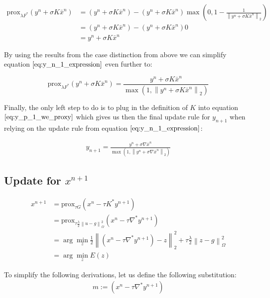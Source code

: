 \documentclass{paper}
\newcommand{\prox}{\text{prox}}
\newcommand{\twonorm}[1]{\left\lVert#1\right\rVert_2}
\newcommand{\norm}[1]{\left\lVert#1\right\rVert}
\begin{document}
\begin{itemize}
		\begin{align}
			\prox_{\lambda F^*}(y^n + \sigma K \bar{x}^{n})
			&= (y^n + \sigma K \bar{x}^{n}) - \left( y^n + \sigma K \bar{x}^{n} \right) \max{\left(0, 1-\frac{1}{\twonorm{y^n + \sigma K \bar{x}^{n} }}\right)} \nonumber \\
			&= (y^n + \sigma K \bar{x}^{n}) - \left( y^n + \sigma K \bar{x}^{n} \right) 0 \nonumber \\
			&= y^n + \sigma K \bar{x}^{n}
		\end{align}
\end{itemize}

By using the results from the case distinction from above we can simplify equation $\ref{eq:y_n_1_expression}$ even further to:

\begin{equation}
	\prox_{\lambda F^*}(y^n + \sigma K \bar{x}^{n}) = \frac{y^n + \sigma K \bar{x}^{n}}{\max{\left(1,\twonorm{y^n + \sigma K \bar{x}^{n}} \right)}}
\label{eq:y_p_1_we_proxy}	
\end{equation}

Finally, the only left step to do is to plug in the definition of $K$ into equation $\ref{eq:y_p_1_we_proxy}$ which gives us then the final update rule for $y_{n+1}$ when relying on the update rule from equation $\ref{eq:y_n_1_expression}$:

\begin{align}
	y_{n+1} = \frac{y^n + \sigma \nabla \bar{x}^{n}}{\max{\left(1,\twonorm{y^n + \sigma \nabla \bar{x}^{n}} \right)}}
\label{eq:update_rule_y_n_p_1}	
\end{align} 	

\subsection{Update for $x^{n+1}$}

\begin{align}
x^{n+1} &= \prox_{\tau G}(x^n - \tau K^* y^{n+1}) \\
		&= \prox_{\tau \frac{\lambda}{2} \norm{u - g}_{\Omega}^2 }(x^n - \tau \nabla^* y^{n+1}) \\
	    &= \arg \min_{z} \frac{1}{2} \twonorm{\left(x^n - \tau \nabla^* y^{n+1} \right) - z}^2 + \tau \frac{\lambda}{2}\norm{z - g}_{\Omega}^2 \\
	    &= \arg \min_{z} E(z)
\label{eq:energy_x_p_1}	    
\end{align}

To simplify the following derivations, let us define the following substitution: 
\begin{align}
	m := \left(x^n - \tau \nabla^* y^{n+1} \right)
\end{align}
\end{document}
